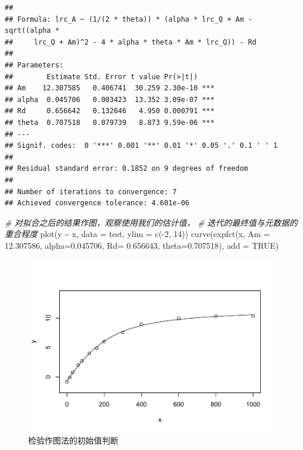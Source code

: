 \documentclass[
]{krantz}
\makeatletter
\newenvironment{Shaded}{\begin{snugshade}}{\end{snugshade}}
\newcommand{\AttributeTok}[1]{\textcolor[rgb]{0.77,0.63,0.00}{#1}}
\newcommand{\CommentTok}[1]{\textcolor[rgb]{0.56,0.35,0.01}{\textit{#1}}}
\newcommand{\ConstantTok}[1]{\textcolor[rgb]{0.00,0.00,0.00}{#1}}
\newcommand{\DecValTok}[1]{\textcolor[rgb]{0.00,0.00,0.81}{#1}}
\newcommand{\FloatTok}[1]{\textcolor[rgb]{0.00,0.00,0.81}{#1}}
\newcommand{\FunctionTok}[1]{\textcolor[rgb]{0.00,0.00,0.00}{#1}}
\newcommand{\NormalTok}[1]{#1}
\newcommand{\SpecialCharTok}[1]{\textcolor[rgb]{0.00,0.00,0.00}{#1}}
\newenvironment{kframe}{%
\medskip{}
\setlength{\fboxsep}{.8em}
 \def\at@end@of@kframe{}%
 \ifinner\ifhmode%
  \def\at@end@of@kframe{\end{minipage}}%
  \begin{minipage}{\columnwidth}%
 \fi\fi%
 \def\FrameCommand##1{\hskip\@totalleftmargin \hskip-\fboxsep
 \colorbox{shadecolor}{##1}\hskip-\fboxsep
     \hskip-\linewidth \hskip-\@totalleftmargin \hskip\columnwidth}%
 \MakeFramed {\advance\hsize-\width
   \@totalleftmargin\z@ \linewidth\hsize
   \@setminipage}}%
 {\par\unskip\endMakeFramed%
 \at@end@of@kframe}
\renewenvironment{Shaded}{\begin{kframe}}{\end{kframe}}
\makeatother
\begin{document}
\begin{verbatim}
## 
## Formula: lrc_A ~ (1/(2 * theta)) * (alpha * lrc_Q + Am - sqrt((alpha * 
##     lrc_Q + Am)^2 - 4 * alpha * theta * Am * lrc_Q)) - Rd
## 
## Parameters:
##        Estimate Std. Error t value Pr(>|t|)    
## Am    12.307585   0.406741  30.259 2.30e-10 ***
## alpha  0.045706   0.003423  13.352 3.09e-07 ***
## Rd     0.656642   0.132646   4.950 0.000791 ***
## theta  0.707518   0.079739   8.873 9.59e-06 ***
## ---
## Signif. codes:  0 '***' 0.001 '**' 0.01 '*' 0.05 '.' 0.1 ' ' 1
## 
## Residual standard error: 0.1852 on 9 degrees of freedom
## 
## Number of iterations to convergence: 7 
## Achieved convergence tolerance: 4.601e-06
\end{verbatim}

\begin{Shaded}
\begin{Highlighting}[]
\CommentTok{\# 对拟合之后的结果作图，观察使用我们的估计值，}
\CommentTok{\# 迭代的最终值与元数据的重合程度}
\FunctionTok{plot}\NormalTok{(y }\SpecialCharTok{\textasciitilde{}}\NormalTok{ x, }\AttributeTok{data =}\NormalTok{ test, }\AttributeTok{ylim =} \FunctionTok{c}\NormalTok{(}\SpecialCharTok{{-}}\DecValTok{2}\NormalTok{, }\DecValTok{14}\NormalTok{))}
\FunctionTok{curve}\NormalTok{(}\FunctionTok{expfct}\NormalTok{(x, }\AttributeTok{Am =} \FloatTok{12.307586}\NormalTok{,}
     \AttributeTok{alpha=}\FloatTok{0.045706}\NormalTok{, }\AttributeTok{Rd=} \FloatTok{0.656643}\NormalTok{, }\AttributeTok{theta=}\FloatTok{0.707518}\NormalTok{), }\AttributeTok{add =} \ConstantTok{TRUE}\NormalTok{)}
\end{Highlighting}
\end{Shaded}

\begin{figure}
\centering
\includegraphics{bookdown_files/figure-latex/alpf-1.pdf}
\caption{\label{fig:alpf}检验作图法的初始值判断}
\end{figure}
\end{document}
